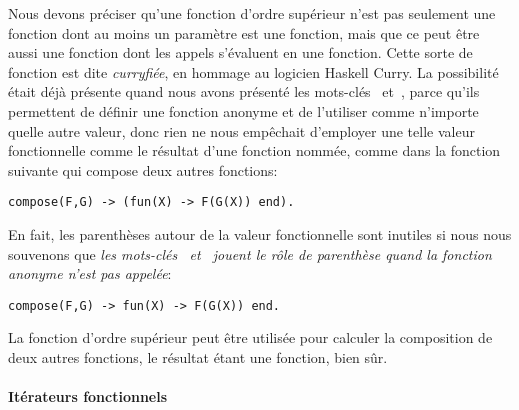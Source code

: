 Nous devons préciser qu'une fonction d'ordre supérieur n'est pas
seulement une fonction dont au moins un paramètre est une fonction,
mais que ce peut être aussi une fonction dont les appels s'évaluent en
une fonction. Cette sorte de fonction est dite
\emph{curryfiée}, en hommage au logicien Haskell
Curry. La possibilité était déjà présente quand nous avons présenté
les mots-clés ~et~, parce qu'ils permettent
de définir une fonction anonyme et de l'utiliser comme n'importe
quelle autre valeur, donc rien ne nous empêchait d'employer une telle
valeur fonctionnelle comme le résultat d'une fonction nommée, comme
dans la fonction suivante qui compose deux autres fonctions:
\begin{verbatim}
compose(F,G) -> (fun(X) -> F(G(X)) end).
\end{verbatim}
En fait, les parenthèses autour de la valeur fonctionnelle sont
inutiles si nous nous souvenons que \emph{les mots-clés
  ~et~ jouent le rôle de parenthèse quand la
  fonction anonyme n'est pas appelée}:
\begin{verbatim}
compose(F,G) -> fun(X) -> F(G(X)) end.
\end{verbatim}
La fonction d'ordre supérieur  peut être utilisée
pour calculer la composition de deux autres fonctions, le résultat
étant une fonction, bien sûr.


\paragraph{Itérateurs fonctionnels}
\label{par_maps}

